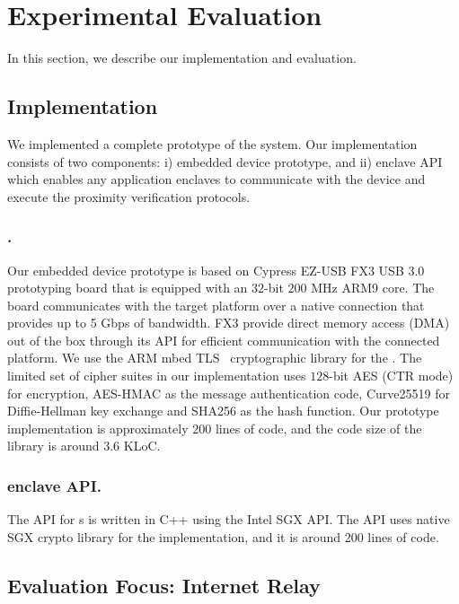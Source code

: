 \section{Experimental Evaluation}
\label{sec:evaluation}

In this section, we describe our implementation and evaluation. 


\subsection{Implementation}
\label{sec:evaluation:implementation}

We implemented a complete prototype of the \name system. Our implementation consists of two components: i) \device embedded device prototype, and ii) \name enclave API which enables any application enclaves to communicate with the \device device and execute the proximity verification protocols.

\subsubsection{\device.} Our embedded device prototype is based on Cypress EZ-USB FX3 USB 3.0 prototyping board that is equipped with an $32$-bit $200$ MHz ARM9 core. The board communicates with the target platform over a native  connection that provides up to 5 Gbps of bandwidth. FX3 provide direct memory access (DMA) out of the box through its API for efficient communication with the connected platform. We use the ARM mbed TLS~\cite{mbed} cryptographic library for the \tls. The limited set of cipher suites in our implementation uses $128$-bit AES (CTR mode) for encryption, AES-HMAC as the message authentication code,  Curve25519 for Diffie-Hellman key exchange and SHA256 as the hash function. Our prototype implementation is approximately $200$ lines of code, and the code size of the \tls library is around $3.6$ KLoC.


\subsubsection{\name enclave API.} 
The \name API for \app{}s is written in C++ using the Intel SGX API. The API uses native SGX crypto library for the \tls implementation, and it is around 200 lines of code.


\subsection{Evaluation Focus: Internet Relay}
\label{sec:evaluation:focus}


